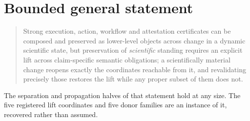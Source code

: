 \section{Bounded general statement}

\begin{quote}
Strong execution, action, workflow and attestation certificates can be
composed and preserved as lower-level objects across change in a dynamic
scientific state, but preservation of \emph{scientific} standing requires an
explicit lift across claim-specific semantic obligations; a scientifically
material change reopens exactly the coordinates reachable from it, and
revalidating precisely those restores the lift while any proper subset of them
does not.
\end{quote}

The separation and propagation halves of that statement hold at any size. The
five registered lift coordinates and five donor families are an instance of it,
recovered rather than assumed.
